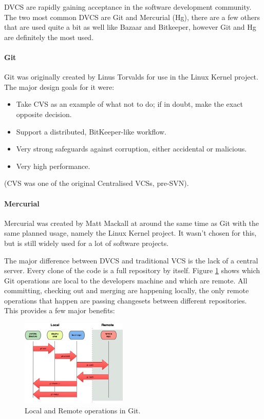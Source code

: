     DVCS are rapidly gaining acceptance in the software development community.
    The two most common DVCS are Git and Mercurial (Hg), there are a few others
    that are used quite a bit as well like Bazaar and Bitkeeper, however Git and
    Hg are definitely the most used.

    \paragraph{Git}

    Git was originally created by Linus Torvalds for use in the Linux Kernel
    project.  The major design goals for it were:

    \begin{itemize}
      \item Take CVS as an example of what not to do; if in doubt, make the exact opposite decision.
      \item Support a distributed, BitKeeper-like workflow.
      \item Very strong safeguards against corruption, either accidental or malicious.
      \item Very high performance.
    \end{itemize}

    (CVS was one of the original Centralised VCSs, pre-SVN).

    \paragraph{Mercurial}
    Mercurial was created by Matt Mackall at around the same time as Git with
    the same planned usage, namely the Linux Kernel project.  It wasn't chosen
    for this, but is still widely used for a lot of software projects.

    The major difference between DVCS and traditional VCS is the lack of a
    central server.  Every clone of the code is a full repository by itself.
    Figure \ref{local-remote} shows which Git operations are local to the
    developers machine and which are remote.  All committing, checking out and
    merging are happening locally, the only remote operations that happen are
    passing changesets between different repositories.  This provides a few major benefits:

    \begin{figure}
      \centering
      \includegraphics[width=0.45\textwidth]{images/local-remote}
      \caption{Local and Remote operations in Git. \cite{whygitisbetterthanx}}
      \label{local-remote}
    \end{figure}

